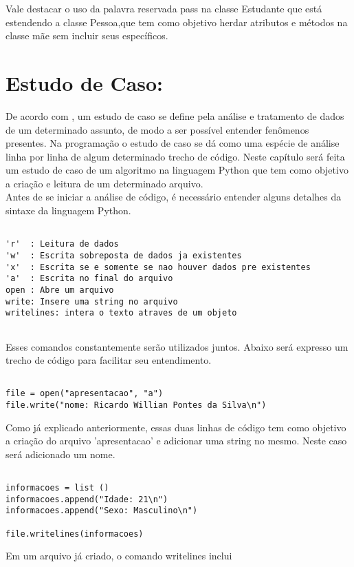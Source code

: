 Vale destacar o uso da palavra reservada pass na classe Estudante que está estendendo a classe Pessoa,que tem como objetivo herdar atributos e métodos na classe mãe sem incluir seus específicos. 
    \section{Estudo de Caso: }
De acordo com \cite{Perkovic2016}, um estudo de caso se define pela análise e tratamento de dados de um determinado assunto, de modo a ser possível entender fenômenos presentes. Na programação o estudo de caso se dá como uma espécie de análise linha por linha de algum determinado trecho de código. Neste capítulo será feita um estudo de caso de um algoritmo na linguagem Python que tem como objetivo a criação e leitura de um determinado arquivo.\\
Antes de se iniciar a análise de código, é necessário entender alguns detalhes da sintaxe da linguagem Python.
\begin{lstlisting}
 	
'r'  : Leitura de dados
'w'  : Escrita sobreposta de dados ja existentes
'x'  : Escrita se e somente se nao houver dados pre existentes
'a'  : Escrita no final do arquivo
open : Abre um arquivo
write: Insere uma string no arquivo
writelines: intera o texto atraves de um objeto 
	
\end{lstlisting}
Esses comandos constantemente serão utilizados juntos. Abaixo será expresso um trecho de código para facilitar seu entendimento.

\begin{lstlisting}

file = open("apresentacao", "a")
file.write("nome: Ricardo Willian Pontes da Silva\n")

\end{lstlisting}
Como já explicado anteriormente, essas duas linhas de código tem como objetivo a criação do arquivo 'apresentacao' e adicionar uma string no mesmo. Neste caso será adicionado um nome.
\begin{lstlisting}
	
informacoes = list ()
informacoes.append("Idade: 21\n")
informacoes.append("Sexo: Masculino\n")

file.writelines(informacoes)

\end{lstlisting} 
Em um arquivo já criado, o comando writelines inclui 